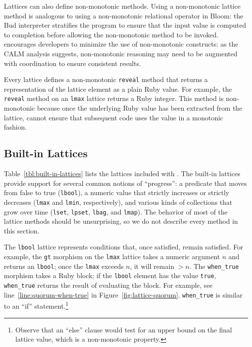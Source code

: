 Lattices can also define non-monotonic methods. Using a non-monotonic lattice
method is analogous to using a non-monotonic relational operator in Bloom: the
Bud interpreter stratifies the program to ensure that the input value is
computed to completion before allowing the non-monotonic method to be
invoked. \lang encourages developers to minimize the use of non-monotonic
constructs: as the CALM analysis suggests, non-monotonic reasoning may need to
be augmented with coordination to ensure consistent results.

Every lattice defines a non-monotonic \texttt{reveal} method that returns a
representation of the lattice element as a plain Ruby value. For example, the
\texttt{reveal} method on an \texttt{lmax} lattice returns a Ruby integer. This
method is non-monotonic because once the underlying Ruby value has been
extracted from the lattice, \lang cannot ensure that subsequent code uses the
value in a monotonic fashion.

\subsection{Built-in Lattices}
\label{sec:lattice-built-ins}

Table~\ref{tbl:built-in-lattices} lists the lattices included with \lang. The
built-in lattices provide support for several common notions of ``progress'': a
predicate that moves from false to true (\texttt{lbool}), a numeric value that
strictly increases or strictly decreases (\texttt{lmax} and \texttt{lmin},
respectively), and various kinds of collections that grow over time
(\texttt{lset}, \texttt{lpset}, \texttt{lbag}, and \texttt{lmap}). The behavior
of most of the lattice methods should be unsurprising, so we do not describe
every method in this section.

The \texttt{lbool} lattice represents conditions that, once satisfied, remain
satisfied. For example, the \texttt{gt} morphism on the \texttt{lmax} lattice
takes a numeric argument $n$ and returns an \texttt{lbool}; once the
\texttt{lmax} exceeds $n$, it will remain $>n$. The \texttt{when\_true} morphism
takes a Ruby block; if the \texttt{lbool} element has the value \texttt{true},
\texttt{when\_true} returns the result of evaluating the block. For example, see
line~\ref{line:quorum-when-true} in
Figure~\ref{fig:lattice-quorum}. \texttt{when\_true} is similar to an ``if''
statement.\footnote{Observe that an ``else'' clause would test for an upper
  bound on the final lattice value, which is a non-monotonic property.}

